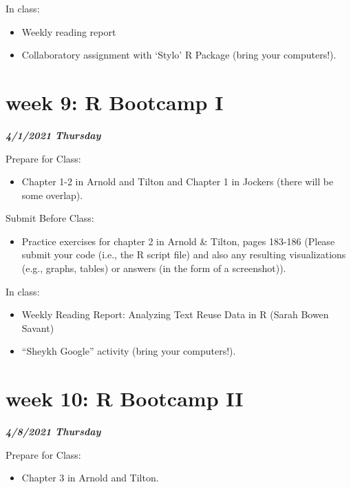 \documentclass[
]{book}
\providecommand{\tightlist}{%
  \setlength{\itemsep}{0pt}\setlength{\parskip}{0pt}}
\begin{document}
In class:

\begin{itemize}
\tightlist
\item
  Weekly reading report
\item
  Collaboratory assignment with `Stylo' R Package (bring your computers!).
\end{itemize}

\hypertarget{week-9-r-bootcamp-i-1}{%
\chapter{week 9: R Bootcamp I}\label{week-9-r-bootcamp-i-1}}

\textbf{\emph{4/1/2021 Thursday}}

Prepare for Class:

\begin{itemize}
\tightlist
\item
  Chapter 1-2 in Arnold and Tilton and Chapter 1 in Jockers (there will be some overlap).
\end{itemize}

Submit Before Class:

\begin{itemize}
\tightlist
\item
  Practice exercises for chapter 2 in Arnold \& Tilton, pages 183-186 (Please submit your code (i.e., the R script file) and also any resulting visualizations (e.g., graphs, tables) or answers (in the form of a screenshot)).
\end{itemize}

In class:

\begin{itemize}
\tightlist
\item
  Weekly Reading Report: Analyzing Text Reuse Data in R (Sarah Bowen Savant)
\item
  ``Sheykh Google'' activity (bring your computers!).
\end{itemize}

\hypertarget{week-10-r-bootcamp-ii-1}{%
\chapter{week 10: R Bootcamp II}\label{week-10-r-bootcamp-ii-1}}

\textbf{\emph{4/8/2021 Thursday}}

Prepare for Class:

\begin{itemize}
\tightlist
\item
  Chapter 3 in Arnold and Tilton.
\end{itemize}
\end{document}
